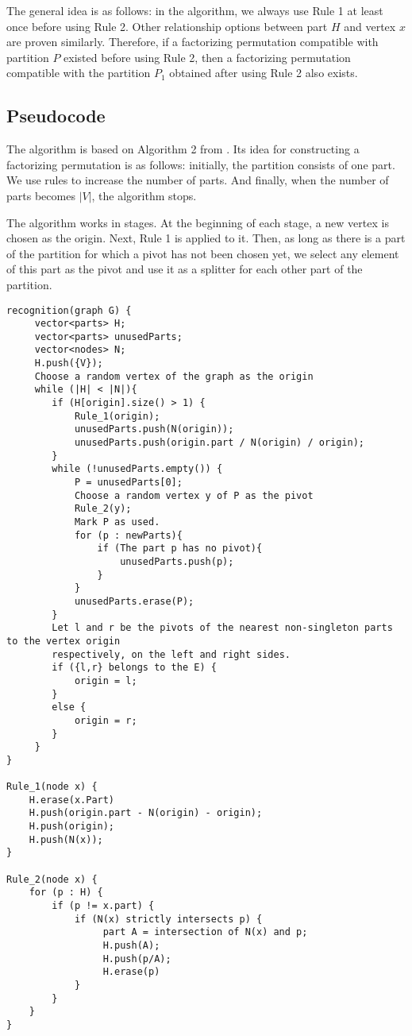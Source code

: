 The general idea is as follows: in the algorithm, we always use Rule 1 at least once before using Rule 2. Other relationship options between part $H$ and vertex $x$ are proven similarly. Therefore, if a factorizing permutation compatible with partition $P$ existed before using Rule 2, then a factorizing permutation compatible with the partition $P_1$ obtained after using Rule 2 also exists.

\subsection{Pseudocode}
The algorithm is based on Algorithm 2 from \cite{HABIB2005183}.
Its idea for constructing a factorizing permutation is as follows: initially, the partition consists of one part. We use rules to increase the number of parts. And finally, when the number of parts becomes $|V|$, the algorithm stops.

The algorithm works in stages. At the beginning of each stage, a new vertex is chosen as the origin. Next, Rule 1 is applied to it. Then, as long as there is a part of the partition for which a pivot has not been chosen yet, we select any element of this part as the pivot and use it as a splitter for each other part of the partition.

\begin{verbatim}
recognition(graph G) {
     vector<parts> H;
     vector<parts> unusedParts;
     vector<nodes> N;
     H.push({V});
     Choose a random vertex of the graph as the origin
     while (|H| < |N|){
        if (H[origin].size() > 1) {
            Rule_1(origin);
            unusedParts.push(N(origin));
            unusedParts.push(origin.part / N(origin) / origin);
        }
        while (!unusedParts.empty()) {
            P = unusedParts[0];
            Choose a random vertex y of P as the pivot
            Rule_2(y);
            Mark P as used.
            for (p : newParts){
                if (The part p has no pivot){
                    unusedParts.push(p);
                }
            }
            unusedParts.erase(P);
        }  
        Let l and r be the pivots of the nearest non-singleton parts to the vertex origin 
        respectively, on the left and right sides.
        if ({l,r} belongs to the E) {
            origin = l;
        }
        else {
            origin = r;
        }
     }
}

Rule_1(node x) {
    H.erase(x.Part)
    H.push(origin.part - N(origin) - origin);
    H.push(origin);
    H.push(N(x)); 
}

Rule_2(node x) {
    for (p : H) {
        if (p != x.part) {
            if (N(x) strictly intersects p) {
                 part A = intersection of N(x) and p;
                 H.push(A);
                 H.push(p/A);
                 H.erase(p)
            }          
        }
    }
}
\end{verbatim}
